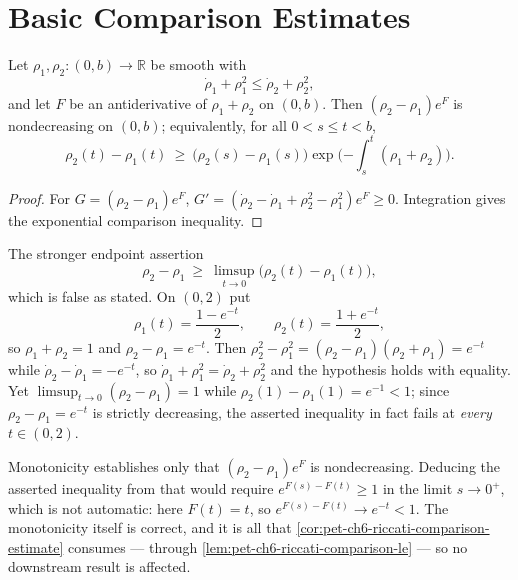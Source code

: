 \section{Basic Comparison Estimates}

\begin{proposition}
  \label{prop:pet-ch6-riccati-comparison-principle}


  Let $\rho_1,\rho_2:(0,b)\to\mathbb{R}$ be smooth with
  \[
    \dot\rho_1+\rho_1^2\le\dot\rho_2+\rho_2^2 ,
  \]
  and let $F$ be an antiderivative of $\rho_1+\rho_2$ on $(0,b)$. Then
  $(\rho_2-\rho_1)e^{F}$ is nondecreasing on $(0,b)$; equivalently, for all
  $0<s\le t<b$,
  \[
    \rho_2(t)-\rho_1(t)\ \ge\ \big(\rho_2(s)-\rho_1(s)\big)
      \exp\Big({-\int_s^t(\rho_1+\rho_2)}\Big).
  \]
\end{proposition}
\begin{proof}

  \sketch
  For \(G=(\rho_2-\rho_1)e^F\), \(G'=(\dot\rho_2-\dot\rho_1+\rho_2^2-\rho_1^2)e^F\ge0\). Integration gives the exponential comparison inequality.
\end{proof}

\begin{remark}
  \label{rem:pet-ch6-riccati-principle-correction}


  The stronger endpoint assertion
  \[
    \rho_2-\rho_1\ \ge\ \limsup_{t\to0}\big(\rho_2(t)-\rho_1(t)\big),
  \]
  which is false as stated. On $(0,2)$ put
  \[
    \rho_1(t)=\frac{1-e^{-t}}{2},\qquad \rho_2(t)=\frac{1+e^{-t}}{2},
  \]
  so $\rho_1+\rho_2=1$ and $\rho_2-\rho_1=e^{-t}$. Then
  $\rho_2^2-\rho_1^2=(\rho_2-\rho_1)(\rho_2+\rho_1)=e^{-t}$ while
  $\dot\rho_2-\dot\rho_1=-e^{-t}$, so $\dot\rho_1+\rho_1^2=\dot\rho_2+\rho_2^2$
  and the hypothesis holds with equality. Yet
  $\limsup_{t\to0}(\rho_2-\rho_1)=1$ while $\rho_2(1)-\rho_1(1)=e^{-1}<1$; since
  $\rho_2-\rho_1=e^{-t}$ is strictly decreasing, the asserted inequality in fact
  fails at \emph{every} $t\in(0,2)$.

  Monotonicity establishes only that
  $(\rho_2-\rho_1)e^{F}$ is nondecreasing. Deducing the asserted inequality from
  that would require $e^{F(s)-F(t)}\ge1$ in the limit $s\to0^+$, which is not
  automatic: here $F(t)=t$, so $e^{F(s)-F(t)}\to e^{-t}<1$. The monotonicity
  itself is correct, and it is all that
  \cref{cor:pet-ch6-riccati-comparison-estimate} consumes — through
  \cref{lem:pet-ch6-riccati-comparison-le} — so no downstream result is affected.
\end{remark}

